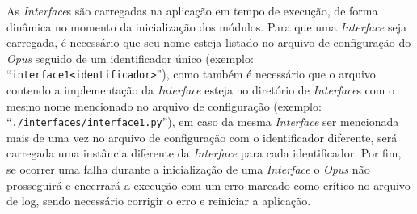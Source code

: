 As \emph{Interface}s são carregadas na aplicação em tempo de execução, de forma dinâmica no momento da inicialização dos módulos. Para que uma \emph{Interface}
seja carregada, é necessário que seu nome esteja listado no arquivo de configuração do \emph{Opus} seguido de um identificador 
único (exemplo: ``\lstinline{interface1<identificador>}''), como também é necessário que o arquivo contendo a implementação da \emph{Interface} esteja 
no diretório de \emph{Interface}s com o mesmo nome mencionado no arquivo de configuração (exemplo: ``\lstinline{./interfaces/interface1.py}''), em 
caso da mesma \emph{Interface} ser mencionada mais de uma vez no arquivo de configuração com o identificador diferente, será carregada uma instância
diferente da \emph{Interface} para cada identificador. Por fim, se ocorrer uma falha durante a inicialização de uma \emph{Interface} o \emph{Opus} 
não prosseguirá e encerrará a execução com um erro marcado como crítico no arquivo de log, sendo necessário corrigir o erro e reiniciar a aplicação.
